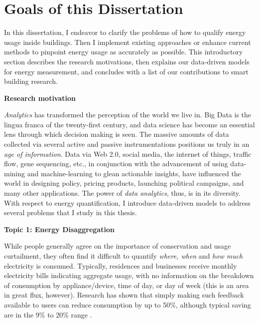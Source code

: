 
\section{Goals of this Dissertation}
In this dissertation, I endeavor to clarify the problems of how to qualify energy usage inside buildings. Then I implement existing approaches or enhance current methods to pinpoint energy usage as accurately as possible. This introductory section describes the research motivations, then explains our data-driven models for energy measurement, and concludes with a list of our contributions to smart building research. 

\textbf{Research motivation}

\emph{Analytics} has transformed the perception of the world we live in. Big Data is the lingua franca of the twenty-first century, and data science has become an essential lens through which decision making is seen. The massive amounts of data collected via several active and passive instrumentations positions us truly in an \emph{age of information}. Data via Web 2.0, social media, the internet of things, traffic flow, gene sequencing, etc., in conjunction with the advancement of using data-mining and machine-learning to glean actionable insights, have influenced the world in designing policy, pricing products, launching political campaigns, and many other applications. The power of \emph{data analytics}, thus, is in its diversity. 
With respect to energy quantification, I introduce data-driven models to address several problems that I study in this thesis. 

\textbf{Topic 1: Energy Disaggregation}

While people generally agree on the importance of conservation and
usage curtailment, they often find it difficult to quantify 
{\em where, when} and {\em how much} electricity is consumed.
Typically, residences and businesses receive
monthly electricity bills indicating aggregate usage, with no information on
the breakdown of consumption by appliance/device, time of day, or day of
week (this is an area in great flux, however). Research has 
shown that simply making such feedback available to users
can reduce consumption by up to 50\%, although typical saving 
are in the 9\% to 20\% range \cite{book2014us}.%

